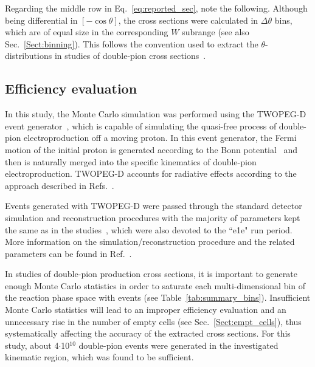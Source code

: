 \documentclass[prc,twocolumn,superscriptaddress,showpacs,amssymb,amsmath,amsfonts,aps,nofootinbib]{revtex4-1}
\begin{document}
Regarding the middle row in Eq.\!~\eqref{eq:reported_sec}, note the following. Although being differential in $[-\cos\theta]$, the cross sections were calculated in $\Delta \theta$ bins, which are of equal size in the corresponding $W$ subrange (see also Sec.\!~\ref{Sect:binning}). This follows the convention used to extract the $\theta$-distributions in studies of double-pion cross sections~\cite{Rip_an_note:2002,Ripani:2002ss,Fed_an_note:2007,Fedotov:2008aa,Isupov:2017lnd,Arjun,Fed_an_note:2017,Fed_paper_2018}.

\subsection{Efficiency evaluation}
\label{Sect:eff_eval}

In this study, the Monte Carlo simulation was performed using the TWOPEG-D event generator~\cite{twopeg-d}, which is capable of simulating the quasi-free process of double-pion electroproduction off a moving proton. In this event generator, the Fermi motion of the initial proton is generated according to the Bonn potential~\cite{Machleidt:1987hj} and then is naturally merged into the specific kinematics of double-pion electroproduction. TWOPEG-D accounts for radiative effects according to the approach described in Refs.\!~\cite{Mo:1968cg,twopeg}.

Events generated with TWOPEG-D were passed through the standard detector simulation and reconstruction procedures with the majority of parameters kept the same as in the studies~\cite{Fed_an_note:2017,Fed_paper_2018,Markov:2014,Ye_Tian:2017,CLAS:2022kta}, which were also devoted to the ``e1e" run period. More information on the simulation/reconstruction procedure and the related parameters can be found in Ref.\!~\cite{my_an_note:2020}.


In studies of double-pion production cross sections, it is important to generate enough Monte Carlo statistics in order to saturate each multi-dimensional bin of the reaction phase space with events (see Table~\ref{tab:summary_bins}). Insufficient Monte Carlo statistics will lead to an improper efficiency evaluation and an unnecessary rise in the number of empty cells (see Sec.\!~\ref{Sect:empt_cells}), thus systematically affecting the accuracy of the extracted cross sections. For this study, about 4$\cdot$10$^{10}$ double-pion events were generated in the investigated kinematic region, which was found to be sufficient.
\end{document}
